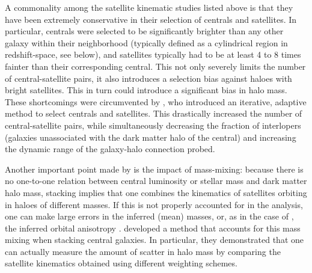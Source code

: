 \documentclass[fleqn,usenatbib,useAMS]{mnras}
\begin{document}
	A commonality among the satellite kinematic studies listed above is that they have been extremely conservative in their selection of centrals and satellites. In particular, centrals were selected to be significantly brighter than any other galaxy within their neighborhood (typically defined as a cylindrical region in redshift-space, see below), and satellites typically had to be at least 4 to 8 times fainter than their corresponding central. This not only severely limits the number of central-satellite pairs, it also introduces a selection bias against haloes with bright satellites. This in turn could introduce a significant bias in halo mass. These shortcomings were circumvented by \cite{vdBosch+04}, who introduced an iterative, adaptive method to select centrals and satellites. This drastically increased the number of central-satellite pairs, while simultaneously decreasing the fraction of interlopers (galaxies unassociated with the dark matter halo of the central) and increasing the dynamic range of the galaxy-halo connection probed.
	
	Another important point made by \cite{vdBosch+04} is the impact of mass-mixing: because there is no one-to-one relation between central luminosity or stellar mass and dark matter halo mass, stacking implies that one combines the kinematics of satellites orbiting in haloes of different masses. If this is not properly accounted for in the analysis, one can make large errors in the inferred (mean) masses, or, as in the case of \cite{Wojtak+13}, the inferred orbital anisotropy \citep[see also][]{Becker+07, Norberg+08}. \cite{More+09a} developed a method that accounts for this mass mixing when stacking central galaxies. In particular, they demonstrated that one can actually measure the amount of scatter in halo mass by comparing the satellite kinematics obtained using different weighting schemes.
	
\end{document}
